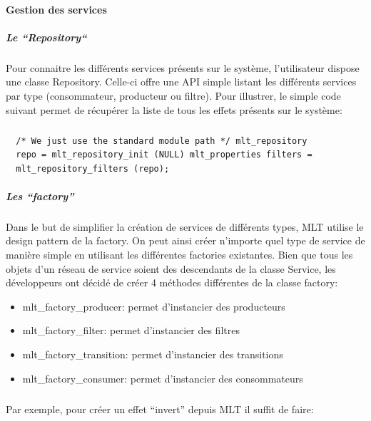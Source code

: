\paragraph{Gestion des services}

\subparagraph{Le ``Repository``}

\subparagraph{}

Pour connaitre les différents services présents sur le système,
l'utilisateur dispose une classe Repository. Celle-ci offre une
API simple listant les différents services par type
(consommateur, producteur ou filtre).  Pour illustrer, le simple code
suivant permet de récupérer la liste de tous les effets présents sur
le système:

\subparagraph{}

\begin{lstlisting}
  /* We just use the standard module path */ mlt_repository
  repo = mlt_repository_init (NULL) mlt_properties filters =
  mlt_repository_filters (repo);
\end{lstlisting}

\subparagraph{Les ``factory''}

\subparagraph{}

Dans le but de simplifier la création de services de différents types,
MLT utilise le design pattern de la factory. On peut ainsi
créer n'importe quel type de service de manière simple en utilisant les
différentes factories existantes. Bien que tous les objets d'un réseau
de service soient des descendants de la classe Service, les développeurs
ont décidé de créer 4 méthodes différentes de la classe factory:

\begin{itemize}

  \item {mlt\_factory\_producer: permet d'instancier des producteurs}

  \item {mlt\_factory\_filter: permet d'instancier des filtres}

  \item {mlt\_factory\_transition: permet d'instancier des transitions}

  \item {mlt\_factory\_consumer: permet d'instancier des consommateurs}

\end{itemize}

\subparagraph{}

Par exemple, pour créer un effet ``invert'' depuis MLT
il suffit de faire:

